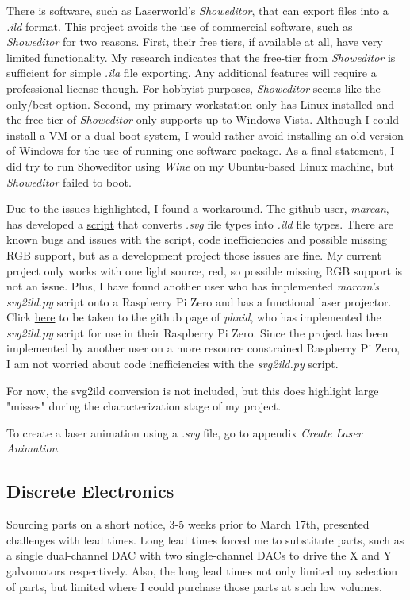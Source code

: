 \documentclass[journal]{IEEEtran}
\begin{document}
    There is software, such as Laserworld's \emph{Showeditor}, that can export files into a \emph{.ild} format.
    This project avoids the use of commercial software, such as \emph{Showeditor} for two reasons.
    First, their free tiers, if available at all, have very limited functionality.
    My research indicates that the free-tier from \emph{Showeditor} is sufficient for simple \emph{.ila} file exporting. 
    Any additional features will require a professional license though.
    For hobbyist purposes, \emph{Showeditor} seems like the only/best option.
    Second, my primary workstation only has Linux installed and the free-tier of \emph{Showeditor} only supports up to Windows Vista.
    Although I could install a VM or a dual-boot system, I would rather avoid installing an old version of Windows for the use of running one software package.
    As a final statement, I did try to run Showeditor using \emph{Wine} on my Ubuntu-based Linux machine, but \emph{Showeditor} failed to boot.

    Due to the issues highlighted, I found a workaround. 
    The github user, \emph{marcan}, has developed a {\href{https://github.com/marcan/openlase/blob/master/tools/svg2ild.py}{script}} that converts \emph{.svg} file types into \emph{.ild} file types.
    There are known bugs and issues with the script, code inefficiencies and possible missing RGB support, but as a development project those issues are fine. 
    My current project only works with one light source, red, so possible missing RGB support is not an issue.
    Plus, I have found another user who has implemented \emph{marcan's svg2ild.py} script onto a Raspberry Pi Zero and has a functional laser projector.
    Click {\href{https://github.com/phuid/laser_projector?tab=readme-ov-file#hw}{here}} to be taken to the github page of \emph{phuid}, who has implemented the \emph{svg2ild.py} script for use in their Raspberry Pi Zero.
    Since the project has been implemented by another user on a more resource constrained Raspberry Pi Zero, I am not worried about code inefficiencies with the \emph{svg2ild.py} script.
    
    For now, the svg2ild conversion is not included, but this does highlight large "misses" during the characterization stage of my project.

    To create a laser animation using a \emph{.svg} file, go to appendix \emph{Create Laser Animation}.

    \subsection{Discrete Electronics}
    Sourcing parts on a short notice, 3-5 weeks prior to March 17th, presented challenges with lead times.
    Long lead times forced me to substitute parts, such as a single dual-channel DAC with two single-channel DACs to drive the X and Y galvomotors respectively.
    Also, the long lead times not only limited my selection of parts, but limited where I could purchase those parts at such low volumes.
\end{document}
